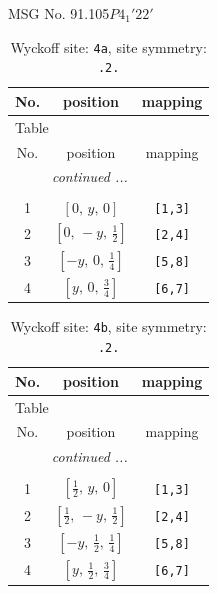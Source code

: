 \documentclass[fleqn,8pt]{jsarticle}
\begin{document}
\setcounter{MaxMatrixCols}{32}

\renewcommand{\tablename}{Table~}
\renewcommand{\figurename}{Figure~}
\begin{center}
\LARGE
MSG No. 91.105\quad$P4_{1}'22'$
\end{center}
\renewcommand{\arraystretch}{1.2}
\begin{longtable}{ccc}
\caption{Wyckoff site: {\tt 4a}, site symmetry: {\tt .2.}}
 \\
 \hline \hline
No. & position & mapping \\ \hline \endfirsthead

\multicolumn{2}{l}{\tablename\ \thetable{}} \\
 \hline \hline
No. & position & mapping \\ \hline \endhead

 \hline \hline
\multicolumn{2}{r}{\footnotesize\it continued ...} \\ \endfoot

 \hline \hline
\multicolumn{2}{r}{} \\ \endlastfoot

1 & $\left[ 0,\, y,\, 0 \right]$ & {\tt [1,3]} \\ \hline
2 & $\left[ 0,\, - y,\, \frac{1}{2} \right]$ & {\tt [2,4]} \\ \hline
3 & $\left[ - y,\, 0,\, \frac{1}{4} \right]$ & {\tt [5,8]} \\ \hline
4 & $\left[ y,\, 0,\, \frac{3}{4} \right]$ & {\tt [6,7]} \\
\end{longtable}
\renewcommand{\arraystretch}{1.2}
\begin{longtable}{ccc}
\caption{Wyckoff site: {\tt 4b}, site symmetry: {\tt .2.}}
 \\
 \hline \hline
No. & position & mapping \\ \hline \endfirsthead

\multicolumn{2}{l}{\tablename\ \thetable{}} \\
 \hline \hline
No. & position & mapping \\ \hline \endhead

 \hline \hline
\multicolumn{2}{r}{\footnotesize\it continued ...} \\ \endfoot

 \hline \hline
\multicolumn{2}{r}{} \\ \endlastfoot

1 & $\left[ \frac{1}{2},\, y,\, 0 \right]$ & {\tt [1,3]} \\ \hline
2 & $\left[ \frac{1}{2},\, - y,\, \frac{1}{2} \right]$ & {\tt [2,4]} \\ \hline
3 & $\left[ - y,\, \frac{1}{2},\, \frac{1}{4} \right]$ & {\tt [5,8]} \\ \hline
4 & $\left[ y,\, \frac{1}{2},\, \frac{3}{4} \right]$ & {\tt [6,7]} \\
\end{longtable}
\end{document}
